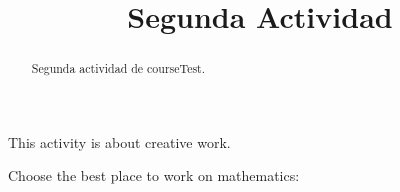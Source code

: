 \documentclass{ximera}
\title{Segunda Actividad}
\begin{document}
  
\begin{abstract}  
	Segunda actividad de courseTest.
\end{abstract}  
\maketitle  

This activity is about creative work.  
\begin{exercise}  
  Choose the best place to work on mathematics:
  \begin{multipleChoice}  
  \end{multipleChoice}  
\end{exercise}  
\end{document}
